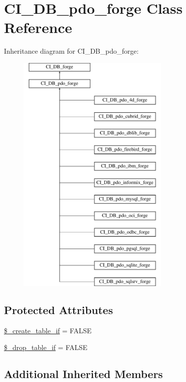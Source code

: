 \hypertarget{class_c_i___d_b__pdo__forge}{}\section{C\+I\+\_\+\+D\+B\+\_\+pdo\+\_\+forge Class Reference}
\label{class_c_i___d_b__pdo__forge}
Inheritance diagram for C\+I\+\_\+\+D\+B\+\_\+pdo\+\_\+forge\+:\begin{figure}[H]
\begin{center}
\leavevmode
\includegraphics[height=12.000000cm]{class_c_i___d_b__pdo__forge}
\end{center}
\end{figure}
\subsection*{Protected Attributes}
\begin{DoxyCompactItemize}
\item 
\hyperlink{class_c_i___d_b__pdo__forge_a2f6484fcb8d1dc3eef67a637227cd583}{\$\+\_\+create\+\_\+table\+\_\+if} = F\+A\+L\+S\+E
\item 
\hyperlink{class_c_i___d_b__pdo__forge_a92a8a9145a7fc91e252e58d019373581}{\$\+\_\+drop\+\_\+table\+\_\+if} = F\+A\+L\+S\+E
\end{DoxyCompactItemize}
\subsection*{Additional Inherited Members}


